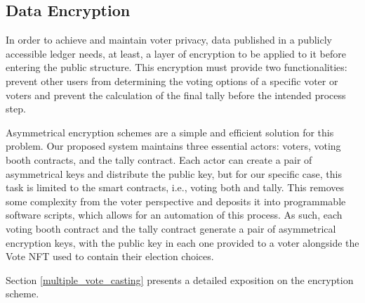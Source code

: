 \documentclass[../main.tex]{subfiles}
\begin{document}
\subsection{Data Encryption}
In order to achieve and maintain voter privacy, data published in a publicly accessible ledger needs, at least, a layer of encryption to be applied to it before entering the public structure. This encryption must provide two functionalities: prevent other users from determining the voting options of a specific voter or voters and prevent the calculation of the final tally before the intended process step.
\par
Asymmetrical encryption schemes are a simple and efficient solution for this problem. Our proposed system maintains three essential actors: voters, voting booth contracts, and the tally contract. Each actor can create a pair of asymmetrical keys and distribute the public key, but for our specific case, this task is limited to the smart contracts, i.e., voting both and tally. This removes some complexity from the voter perspective and deposits it into programmable software scripts, which allows for an automation of this process. As such, each voting booth contract and the tally contract generate a pair of asymmetrical encryption keys, with the public key in each one provided to a voter alongside the Vote NFT used to contain their election choices.
\par
Section \ref{multiple_vote_casting} presents a detailed exposition on the encryption scheme.
\end{document}
